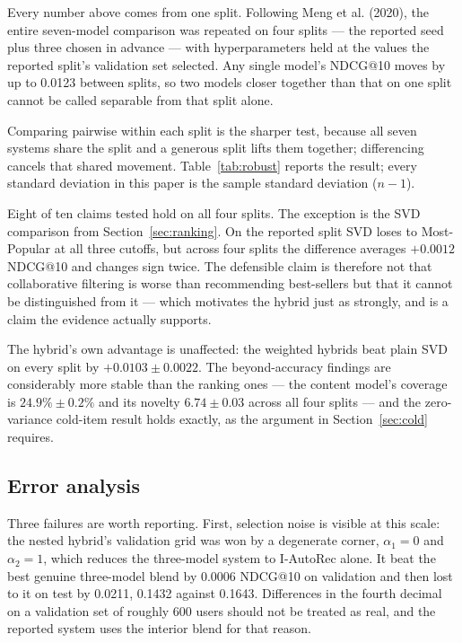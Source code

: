 \documentclass[10pt,twocolumn,letterpaper]{article}
\begin{document}
Every number above comes from one split. Following Meng et al. (2020), the
entire seven-model comparison was repeated on four splits --- the reported
seed plus three chosen in advance --- with hyperparameters held at the values
the reported split's validation set selected. Any single model's NDCG@10 moves
by up to 0.0123 between splits, so two models closer together than that on one
split cannot be called separable from that split alone.

Comparing pairwise within each split is the sharper test, because all seven
systems share the split and a generous split lifts them together; differencing
cancels that shared movement. Table~\ref{tab:robust} reports the result; every standard deviation in this paper is the sample standard deviation ($n-1$).

Eight of ten claims tested hold on all four splits. The exception is the SVD
comparison from Section~\ref{sec:ranking}. On the reported split SVD loses to
Most-Popular at all three cutoffs, but across four splits the difference
averages $+0.0012$ NDCG@10 and changes sign twice. The defensible claim is
therefore not that collaborative filtering is worse than recommending
best-sellers but that it cannot be distinguished from it --- which motivates
the hybrid just as strongly, and is a claim the evidence actually supports.

The hybrid's own advantage is unaffected: the weighted hybrids beat plain SVD
on every split by $+0.0103 \pm 0.0022$. The beyond-accuracy findings are
considerably more stable than the ranking ones --- the content model's
coverage is $24.9\% \pm 0.2\%$ and its novelty $6.74 \pm 0.03$ across all four
splits --- and the zero-variance cold-item result holds exactly, as the
argument in Section~\ref{sec:cold} requires.

\subsection{Error analysis}
Three failures are worth reporting. First, selection noise is visible at this
scale: the nested hybrid's validation grid was won by a degenerate corner,
$\alpha_1 = 0$ and $\alpha_2 = 1$, which reduces the three-model system to
I-AutoRec alone. It beat the best genuine three-model blend by 0.0006 NDCG@10
on validation and then lost to it on test by 0.0211, 0.1432 against 0.1643.
Differences in the fourth decimal on a validation set of roughly 600 users
should not be treated as real, and the reported system uses the interior blend
for that reason.
\end{document}
